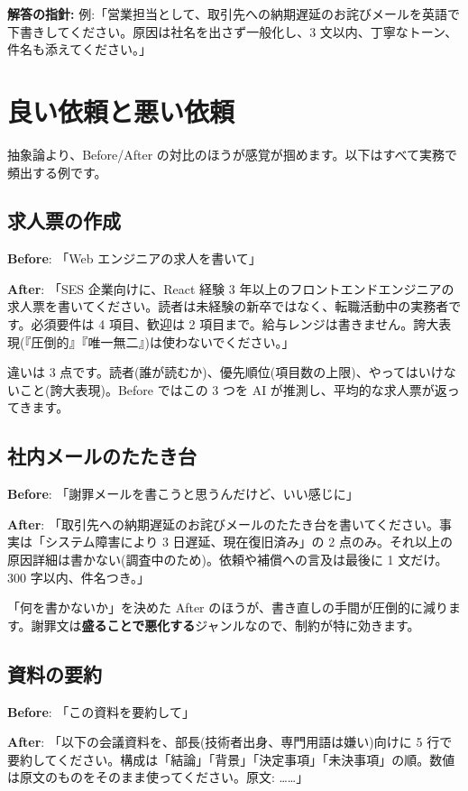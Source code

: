 \documentclass{article}
\begin{document}
\textbf{解答の指針:} 例:「営業担当として、取引先への納期遅延のお詫びメールを英語で下書きしてください。原因は社名を出さず一般化し、3 文以内、丁寧なトーン、件名も添えてください。」

\section{良い依頼と悪い依頼}

抽象論より、Before/After の対比のほうが感覚が掴めます。以下はすべて実務で頻出する例です。

\subsection{求人票の作成}

\textbf{Before}: 「Web エンジニアの求人を書いて」

\textbf{After}: 「SES 企業向けに、React 経験 3 年以上のフロントエンドエンジニアの求人票を書いてください。読者は未経験の新卒ではなく、転職活動中の実務者です。必須要件は 4 項目、歓迎は 2 項目まで。給与レンジは書きません。誇大表現(『圧倒的』『唯一無二』)は使わないでください。」

違いは 3 点です。読者(誰が読むか)、優先順位(項目数の上限)、やってはいけないこと(誇大表現)。Before ではこの 3 つを AI が推測し、平均的な求人票が返ってきます。

\subsection{社内メールのたたき台}

\textbf{Before}: 「謝罪メールを書こうと思うんだけど、いい感じに」

\textbf{After}: 「取引先への納期遅延のお詫びメールのたたき台を書いてください。事実は「システム障害により 3 日遅延、現在復旧済み」の 2 点のみ。それ以上の原因詳細は書かない(調査中のため)。依頼や補償への言及は最後に 1 文だけ。300 字以内、件名つき。」

「何を書かないか」を決めた After のほうが、書き直しの手間が圧倒的に減ります。謝罪文は\textbf{盛ることで悪化する}ジャンルなので、制約が特に効きます。

\subsection{資料の要約}

\textbf{Before}: 「この資料を要約して」

\textbf{After}: 「以下の会議資料を、部長(技術者出身、専門用語は嫌い)向けに 5 行で要約してください。構成は「結論」「背景」「決定事項」「未決事項」の順。数値は原文のものをそのまま使ってください。原文: ……」
\end{document}
